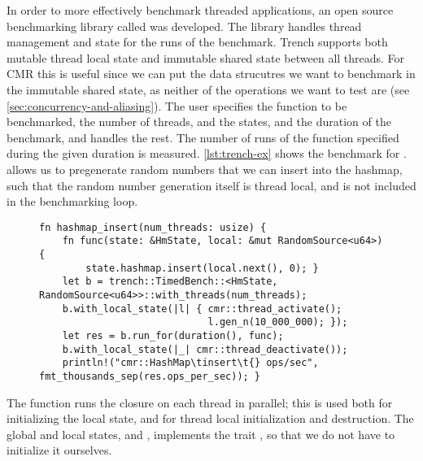 In order to more effectively benchmark threaded applications, an open source benchmarking library
called \cite{trench} was developed. The library handles thread management and state
for the runs of the benchmark. Trench supports both mutable thread local state and immutable shared
state between all threads. For CMR this is useful since we can put the data strucutres we want to
benchmark in the immutable shared state, as neither of the operations we want to test are
 (see \cref{sec:concurrency-and-aliasing}). The user specifies the function to be
benchmarked, the number of threads, and the states, and the duration of the benchmark, and
 handles the rest. The number of runs of the function specified during the given
duration is measured.  \cref{lst:trench-ex} shows the benchmark for .
 allows us to pregenerate random numbers that we can insert into the hashmap,
such that the random number generation itself is thread local, and is not included in the
benchmarking loop.

\begin{figure}[ht]
\begin{lstlisting}[label=lst:trench-ex,caption=\code{Hashmap::insert} benchmark using \code{trench}]
fn hashmap_insert(num_threads: usize) {
    fn func(state: &HmState, local: &mut RandomSource<u64>) {
        state.hashmap.insert(local.next(), 0); }
    let b = trench::TimedBench::<HmState, RandomSource<u64>>::with_threads(num_threads);
    b.with_local_state(|l| { cmr::thread_activate();
                             l.gen_n(10_000_000); });
    let res = b.run_for(duration(), func);
    b.with_local_state(|_| cmr::thread_deactivate());
    println!("cmr::HashMap\tinsert\t{} ops/sec", fmt_thousands_sep(res.ops_per_sec)); }
\end{lstlisting}
\end{figure}

The  function runs the closure on each thread in parallel; this is used both
for initializing the local state, and for thread local initialization and destruction.
The global and local states,  and , implements the trait
, so that we do not have to initialize it ourselves.

